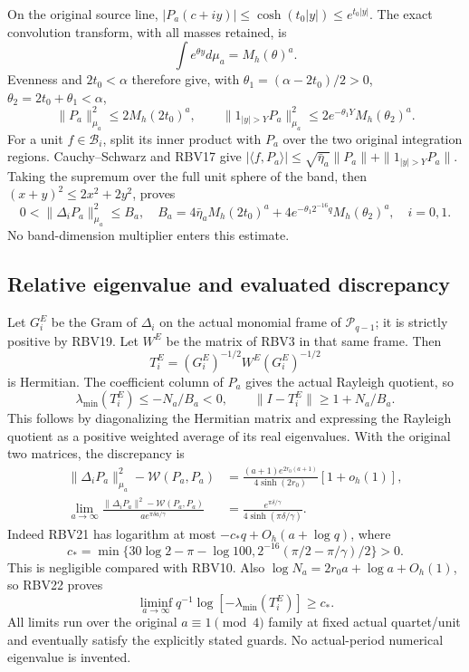 \documentclass[11pt,a4paper]{article}
\begin{document}
On the original source line,
$|P_a(c+iy)|\le\cosh(t_0|y|)\le e^{t_0|y|}$.
The exact convolution transform, with all masses retained, is
\[
\int e^{\theta y}d\mu_a=M_h(\theta)^a.
\]
Evenness and $2t_0<\alpha$ therefore give, with
$\theta_1=(\alpha-2t_0)/2>0$, $\theta_2=2t_0+\theta_1<\alpha$,
\[
\|P_a\|_{\mu_a}^2\le2M_h(2t_0)^a,\qquad
\|1_{|y|>Y}P_a\|_{\mu_a}^2
 \le2e^{-\theta_1Y}M_h(\theta_2)^a.
\tag{RBV20}
\]
For a unit $f\in\mathcal B_i$, split its inner product with $P_a$
over the two original integration regions. Cauchy--Schwarz and RBV17
give
$|\langle f,P_a\rangle|\le\sqrt{\bar\eta_a}\|P_a\|+
\|1_{|y|>Y}P_a\|$. Taking the supremum over the full unit sphere
of the band, then $(x+y)^2\le2x^2+2y^2$, proves
\[
\boxed{0<\|\Delta_iP_a\|_{\mu_a}^2\le B_a,
\quad B_a=4\bar\eta_aM_h(2t_0)^a+
4e^{-\theta_1 2^{-16}q}M_h(\theta_2)^a,\quad i=0,1.}
\tag{RBV21}
\]
No band-dimension multiplier enters this estimate.

\subsection{Relative eigenvalue and evaluated discrepancy}
Let $G_i^E$ be the Gram of $\Delta_i$ on the actual monomial frame
of $\mathcal P_{q-1}$; it is strictly positive by RBV19.
Let $W^E$ be the matrix of RBV3 in that same frame. Then
\[
T_i^E=(G_i^E)^{-1/2}W^E(G_i^E)^{-1/2}
\]
is Hermitian. The coefficient column of $P_a$ gives the actual
Rayleigh quotient, so
\[
\lambda_{\min}(T_i^E)\le-N_a/B_a<0,\qquad
\|I-T_i^E\|\ge1+N_a/B_a.\tag{RBV22}
\]
This follows by diagonalizing the Hermitian matrix and expressing
the Rayleigh quotient as a positive weighted average of its real
eigenvalues. With the original two matrices, the discrepancy is
\[
\begin{split}
\|\Delta_iP_a\|_{\mu_a}^2-\mathcal W(P_a,P_a)
&=\frac{(a+1)e^{2r_0(a+1)}}{4\sinh(2r_0)}[1+o_h(1)],\\
\lim_{a\to\infty}\frac{\|\Delta_iP_a\|^2-\mathcal W(P_a,P_a)}
 {a e^{\pi\delta a/\gamma}}
&=\frac{e^{\pi\delta/\gamma}}{4\sinh(\pi\delta/\gamma)}.
\end{split}\tag{RBV23}
\]
Indeed RBV21 has logarithm at most
$-c_*q+O_h(a+\log q)$, where
\[
c_*=\min\{30\log2-\pi-\log100,
                   2^{-16}(\pi/2-\pi/\gamma)/2\}>0.
\tag{RBV24}
\]
This is negligible compared with RBV10. Also
$\log N_a=2r_0a+\log a+O_h(1)$, so RBV22 proves
\[
\liminf_{a\to\infty}q^{-1}\log[-\lambda_{\min}(T_i^E)]\ge c_*.
\tag{RBV25}
\]
All limits run over the original $a\equiv1\pmod4$ family at fixed
actual quartet/unit and eventually satisfy the explicitly stated
guards. No actual-period numerical eigenvalue is invented.
\end{document}
